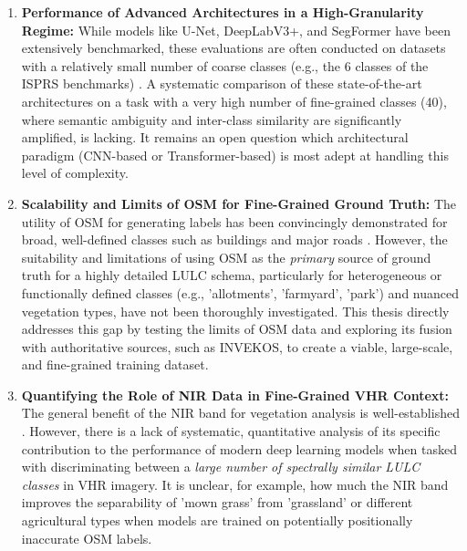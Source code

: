 \documentclass{report}
\begin{document}
\begin{enumerate}
\item \textbf{Performance of Advanced Architectures in a High-Granularity Regime:} While models like U-Net, DeepLabV3+, and SegFormer have been extensively benchmarked, these evaluations are often conducted on datasets with a relatively small number of coarse classes (e.g., the 6 classes of the ISPRS benchmarks) \parencite[p.~2, 8]{SertelEtAlLandUseLandCoverMappingUsingDeepLearningBasedSegmentationApproachesVHRWorldview3Images2022}. A systematic comparison of these state-of-the-art architectures on a task with a very high number of fine-grained classes (40), where semantic ambiguity and inter-class similarity are significantly amplified, is lacking. It remains an open question which architectural paradigm (CNN-based or Transformer-based) is most adept at handling this level of complexity.

\item \textbf{Scalability and Limits of OSM for Fine-Grained Ground Truth:} The utility of OSM for generating labels has been convincingly demonstrated for broad, well-defined classes such as buildings and major roads \parencite[p.~1, 13]{KaiserEtAlLearningAerialImageSegmentationOnlineMaps2017}. However, the suitability and limitations of using OSM as the \textit{primary} source of ground truth for a highly detailed LULC schema, particularly for heterogeneous or functionally defined classes (e.g., 'allotments', 'farmyard', 'park') and nuanced vegetation types, have not been thoroughly investigated. This thesis directly addresses this gap by testing the limits of OSM data and exploring its fusion with authoritative sources, such as INVEKOS, to create a viable, large-scale, and fine-grained training dataset.

    \item \textbf{Quantifying the Role of NIR Data in Fine-Grained VHR Context:} The general benefit of the NIR band for vegetation analysis is well-established \parencite[p.~180]{LuoEtAlSemanticsegmentationagriculturalimagessurvey2024}. However, there is a lack of systematic, quantitative analysis of its specific contribution to the performance of modern deep learning models when tasked with discriminating between a \textit{large number of spectrally similar LULC classes} in VHR imagery. It is unclear, for example, how much the NIR band improves the separability of 'mown grass' from 'grassland' or different agricultural types when models are trained on potentially positionally inaccurate OSM labels.


\end{enumerate}
\end{document}
